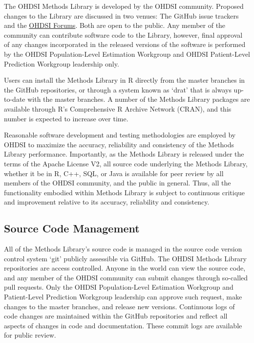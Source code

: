 \documentclass[]{book}
\begin{document}
The OHDSI Methods Library is developed by the OHDSI community. Proposed
changes to the Library are discussed in two venues: The GitHub issue
trackers and the \href{http://forums.ohdsi.org/}{OHDSI Forums}. Both are
open to the public. Any member of the community can contribute software
code to the Library, however, final approval of any changes incorporated
in the released versions of the software is performed by the OHDSI
Population-Level Estimation Workgroup and OHDSI Patient-Level Prediction
Workgroup leadership only.

Users can install the Methods Library in R directly from the master
branches in the GitHub repositories, or through a system known as `drat'
that is always up-to-date with the master branches. A number of the
Methods Library packages are available through R's Comprehensive R
Archive Network (CRAN), and this number is expected to increase over
time.

Reasonable software development and testing methodologies are employed
by OHDSI to maximize the accuracy, reliability and consistency of the
Methods Library performance. Importantly, as the Methods Library is
released under the terms of the Apache License V2, all source code
underlying the Methods Library, whether it be in R, C++, SQL, or Java is
available for peer review by all members of the OHDSI community, and the
public in general. Thus, all the functionality embodied within Methods
Library is subject to continuous critique and improvement relative to
its accuracy, reliability and consistency.

\subsection{Source Code Management}\label{source-code-management}

All of the Methods Library's source code is managed in the source code
version control system `git' publicly assessible via GitHub. The OHDSI
Methods Library repositories are access controlled. Anyone in the world
can view the source code, and any member of the OHDSI community can
submit changes through so-called pull requests. Only the OHDSI
Population-Level Estimation Workgroup and Patient-Level Prediction
Workgroup leadership can approve such request, make changes to the
master branches, and release new versions. Continuous logs of code
changes are maintained within the GitHub repositories and reflect all
aspects of changes in code and documentation. These commit logs are
available for public review.
\end{document}
